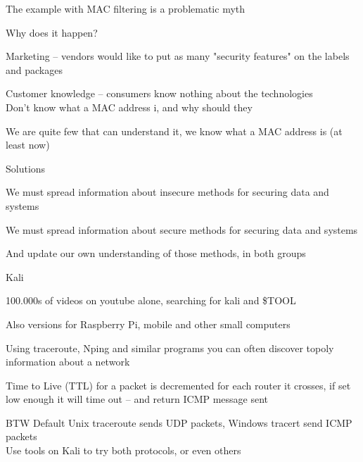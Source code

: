 \documentclass[Screen16to9,17pt]{foils}
\begin{document}
The example with MAC filtering is a problematic myth

Why does it happen?
\begin{list2}
\item Marketing -- vendors would like to put as many "security features" on the labels and packages
\item Customer knowledge -- consumers know nothing about the technologies\\
Don't know what a MAC address i, and why should they
\item We are quite few that can understand it, we know what a MAC address is (at least now)
\end{list2}

Solutions
\begin{list2}
\item We must spread information about insecure methods for securing data and systems
\item We must spread information about secure methods for securing data and systems
\item And update our own understanding of those methods, in both groups
\end{list2}







\begin{list1}
\item  Kali 
\item 100.000s of videos on youtube alone, searching for kali and \$TOOL
\item Also versions for Raspberry Pi, mobile and other small computers
\end{list1}




\begin{list2}
\item Using traceroute, Nping and similar programs you can often discover topoly information about a network
\item Time to Live (TTL) for a packet is decremented for each router it crosses, if set low enough it will time out -- and return ICMP message sent
\item BTW Default Unix traceroute sends UDP packets, Windows tracert send ICMP packets\\
Use tools on Kali to try both protocols, or even others
\end{list2}
\end{document}
